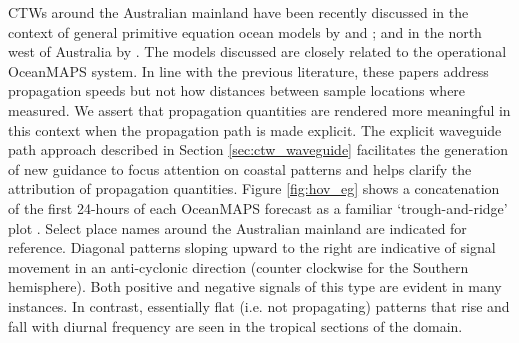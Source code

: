 CTWs around the Australian mainland have been recently discussed in the context of general primitive equation ocean models by \citet{Woodham:2013cl} and \citet{Liao:2018jd}; and in the north west of Australia by \cite{Maxime:2019jc}.  The models discussed are closely related to the operational OceanMAPS system. 
In line with the previous literature, these papers address propagation speeds but not how distances between sample locations where measured.
We assert that propagation quantities are rendered more meaningful in this context when the propagation path is made explicit.
The explicit waveguide path approach described in Section \ref{sec:ctw_waveguide} facilitates the generation of new guidance to focus attention on coastal patterns and helps clarify the attribution of propagation quantities.  
Figure \ref{fig:hov_eg} shows a concatenation of the first 24-hours of each OceanMAPS forecast as a familiar `trough-and-ridge' plot \citep{hovmoller:1949}.
Select place names around the Australian mainland are indicated for reference.
Diagonal patterns sloping upward to the right are indicative of signal movement in an anti-cyclonic direction (counter clockwise for the Southern hemisphere).  Both positive and negative signals of this type are evident in many instances.
In contrast, essentially flat (i.e. not propagating) patterns that rise and fall with diurnal frequency are seen in the tropical sections of the domain.   


